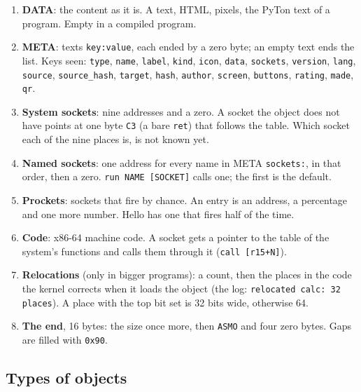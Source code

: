\documentclass[11pt,a4paper]{article}
\newcommand{\cmd}[1]{\texttt{#1}}
\begin{document}
\begin{enumerate}
\item \textbf{DATA}: the content as it is. A text, HTML, pixels, the PyTon text of a program.
      Empty in a compiled program.
\item \textbf{META}: texts \texttt{key:value}, each ended by a zero byte; an empty text ends the
      list. Keys seen: \texttt{type}, \texttt{name}, \texttt{label}, \texttt{kind}, \texttt{icon},
      \texttt{data}, \texttt{sockets}, \texttt{version}, \texttt{lang}, \texttt{source},
      \texttt{source\_hash}, \texttt{target}, \texttt{hash}, \texttt{author}, \texttt{screen},
      \texttt{buttons}, \texttt{rating}, \texttt{made}, \texttt{qr}.
\item \textbf{System sockets}: nine addresses and a zero. A socket the object does not have points
      at one byte \texttt{C3} (a bare \texttt{ret}) that follows the table. Which socket each of
      the nine places is, is not known yet.
\item \textbf{Named sockets}: one address for every name in META \texttt{sockets:}, in that order,
      then a zero. \cmd{run NAME [SOCKET]} calls one; the first is the default.
\item \textbf{Prockets}: sockets that fire by chance. An entry is an address, a percentage and one
      more number. Hello has one that fires half of the time.
\item \textbf{Code}: x86-64 machine code. A socket gets a pointer to the table of the system's
      functions and calls them through it (\texttt{call [r15+N]}).
\item \textbf{Relocations} (only in bigger programs): a count, then the places in the code the
      kernel corrects when it loads the object (the log: \texttt{relocated calc: 32 places}).
      A place with the top bit set is 32 bits wide, otherwise 64.
\item \textbf{The end}, 16 bytes: the size once more, then \texttt{ASMO} and four zero bytes.
      Gaps are filled with \texttt{0x90}.
\end{enumerate}

\subsection{Types of objects}
\end{document}
